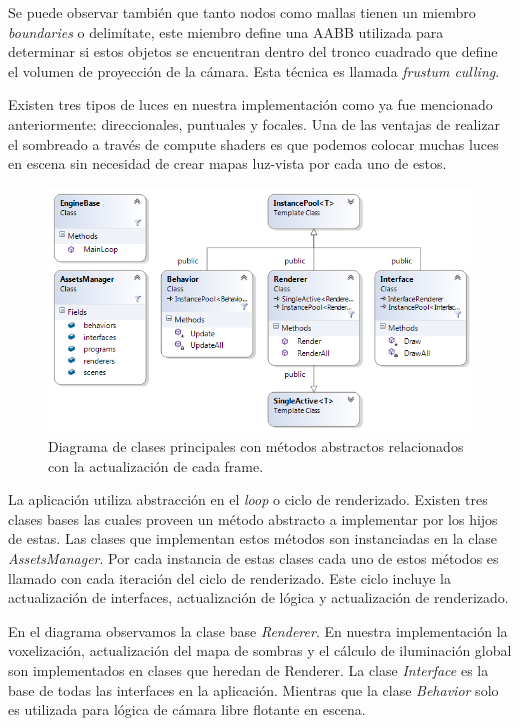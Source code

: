 Se puede observar también que tanto nodos como mallas tienen un miembro \emph{boundaries} o delimítate, este miembro define una \ac{AABB} utilizada para determinar si estos objetos se encuentran dentro del tronco cuadrado que define el volumen de proyección de la cámara. Esta técnica es llamada \emph{frustum culling}. 

Existen tres tipos de luces en nuestra implementación como ya fue mencionado anteriormente: direccionales, puntuales y focales. Una de las ventajas de realizar el sombreado a través de compute shaders es que podemos colocar muchas luces en escena sin necesidad de crear mapas luz-vista por cada uno de estos.

\begin{figure}[H]
	\centering
	\captionsetup{justification=centering}
	\includegraphics[width=\linewidth]{media/ClassDiagram.png}
	\caption{Diagrama de clases principales con métodos abstractos relacionados con la actualización de cada frame.}
\end{figure}

La aplicación utiliza abstracción en el \emph{loop} o ciclo de renderizado. Existen tres clases bases las cuales proveen un método abstracto a implementar por los hijos de estas. Las clases que implementan estos métodos son instanciadas en la clase \emph{AssetsManager}. Por cada instancia de estas clases cada uno de estos métodos es llamado con cada iteración del ciclo de renderizado. Este ciclo incluye la actualización de interfaces, actualización de lógica y actualización de renderizado.

En el diagrama observamos la clase base \emph{Renderer}. En nuestra implementación la voxelización, actualización del mapa de sombras y el cálculo de iluminación global son implementados en clases que heredan de Renderer. La clase \emph{Interface} es la base de todas las interfaces en la aplicación. Mientras que la clase \emph{Behavior} solo es utilizada para lógica de cámara libre flotante en escena.

